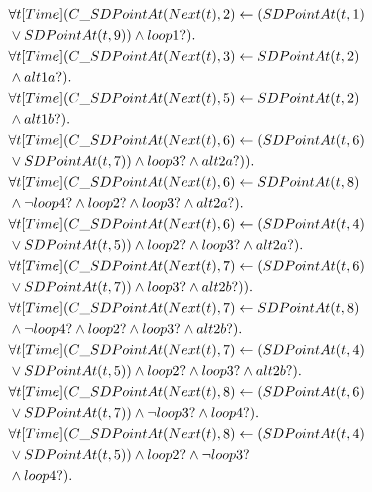 \begin{align*}
	&\forall{t}[Time](C\_SDPointAt(Next(t), 2) \leftarrow (SDPointAt(t, 1) \\ &\lor SDPointAt(t, 9)) \land \fragcond{loop1}). \\
	&\forall{t}[Time](C\_SDPointAt(Next(t), 3) \leftarrow SDPointAt(t, 2) \\ &\land \fragcond{alt1a}). \\
	&\forall{t}[Time](C\_SDPointAt(Next(t), 5) \leftarrow SDPointAt(t, 2) \\ &\land \fragcond{alt1b}). \\
	&\forall{t}[Time](C\_SDPointAt(Next(t), 6) \leftarrow (SDPointAt(t, 6) \\ &\lor SDPointAt(t, 7)) \land \fragcond{loop3} \land \fragcond{alt2a})). \\
	&\forall{t}[Time](C\_SDPointAt(Next(t), 6) \leftarrow SDPointAt(t, 8) \\ &\land \lnot \fragcond{loop4} \land \fragcond{loop2} \land \fragcond{loop3} \land \fragcond{alt2a}). \\
	&\forall{t}[Time](C\_SDPointAt(Next(t), 6) \leftarrow (SDPointAt(t, 4) \\ &\lor SDPointAt(t, 5)) \land \fragcond{loop2} \land \fragcond{loop3} \land \fragcond{alt2a}). \\
	&\forall{t}[Time](C\_SDPointAt(Next(t), 7) \leftarrow (SDPointAt(t, 6) \\ &\lor SDPointAt(t, 7)) \land \fragcond{loop3} \land \fragcond{alt2b})). \\
	&\forall{t}[Time](C\_SDPointAt(Next(t), 7) \leftarrow SDPointAt(t, 8) \\ &\land \lnot \fragcond{loop4} \land \fragcond{loop2} \land \fragcond{loop3} \land \fragcond{alt2b}). \\
	&\forall{t}[Time](C\_SDPointAt(Next(t), 7) \leftarrow (SDPointAt(t, 4) \\ &\lor SDPointAt(t, 5)) \land \fragcond{loop2} \land \fragcond{loop3} \land \fragcond{alt2b}).\\
	&\forall{t}[Time](C\_SDPointAt(Next(t), 8) \leftarrow (SDPointAt(t, 6) \\ &\lor SDPointAt(t, 7)) \land \lnot \fragcond{loop3} \land \fragcond{loop4}). \\
	&\forall{t}[Time](C\_SDPointAt(Next(t), 8) \leftarrow (SDPointAt(t, 4) \\ &\lor SDPointAt(t, 5)) \land \fragcond{loop2} \land \lnot \fragcond{loop3} \\ &\land \fragcond{loop4}). \\

\end{align*}
